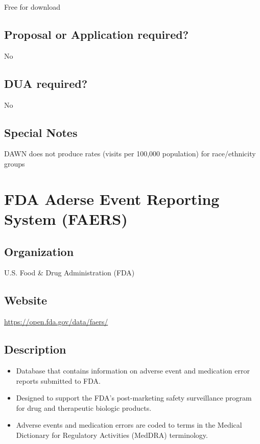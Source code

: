 \documentclass[
]{book}
\providecommand{\tightlist}{%
  \setlength{\itemsep}{0pt}\setlength{\parskip}{0pt}}
\begin{document}
Free for download

\hypertarget{proposal-or-application-required-23}{%
\section{Proposal or Application required?}\label{proposal-or-application-required-23}}

No

\hypertarget{dua-required-23}{%
\section{DUA required?}\label{dua-required-23}}

No

\hypertarget{special-notes-23}{%
\section{Special Notes}\label{special-notes-23}}

DAWN does not produce rates (visits per 100,000 population) for race/ethnicity groups

\mainmatter

\hypertarget{fda-aderse-event-reporting-system-faers}{%
\chapter{FDA Aderse Event Reporting System (FAERS)}\label{fda-aderse-event-reporting-system-faers}}

\hypertarget{organization-24}{%
\section{Organization}\label{organization-24}}

U.S. Food \& Drug Administration (FDA)

\hypertarget{website-24}{%
\section{Website}\label{website-24}}

\url{https://open.fda.gov/data/faers/}

\hypertarget{description-24}{%
\section{Description}\label{description-24}}

\begin{itemize}
\tightlist
\item
  Database that contains information on adverse event and medication error reports submitted to FDA.
\item
  Designed to support the FDA's post-marketing safety surveillance program for drug and therapeutic biologic products.
\item
  Adverse events and medication errors are coded to terms in the Medical Dictionary for Regulatory Activities (MedDRA) terminology.
\end{itemize}
\end{document}
